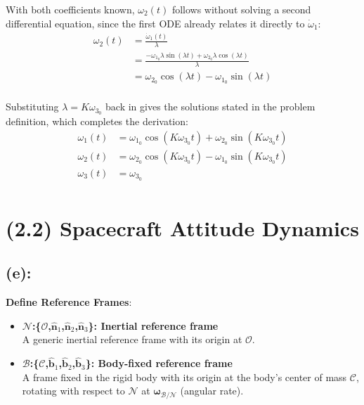 \documentclass[titlepage]{article}
\begin{document}
With both coefficients known, $\omega_2(t)$ follows without solving a second differential equation, since the first ODE already relates it directly to $\dot{\omega}_1$:
\begin{equation}
	\begin{split}
		\omega_2(t)&=\frac{\dot{\omega}_1(t)}{\lambda} \\
		&=\frac{-\omega_{1_0}\lambda\sin\left(\lambda t\right)+\omega_{2_0}\lambda\cos\left(\lambda t\right)}{\lambda} \\
		&=\omega_{2_0}\cos\left(\lambda t\right)-\omega_{1_0}\sin\left(\lambda t\right) \\
	\end{split}
\end{equation}

\begin{mdframed}[linewidth=1pt, innertopmargin=10pt, innerbottommargin=10pt]
	Substituting $\lambda=K\omega_{3_0}$ back in gives the solutions stated in the problem definition, which completes the derivation:
	\begin{equation}
		\begin{split}
			\omega_1(t)&=\omega_{1_0}\cos(K\omega_{3_0}t)+\omega_{2_0}\sin(K\omega_{3_0}t) \\
			\omega_2(t)&=\omega_{2_0}\cos(K\omega_{3_0}t)-\omega_{1_0}\sin(K\omega_{3_0}t) \\
			\omega_3(t)&=\omega_{3_0} \\
		\end{split}
	\end{equation}
\end{mdframed}

\newpage

\section*{(2.2) Spacecraft Attitude Dynamics}

\subsection*{(e):}
\textbf{Define Reference Frames}:
\begin{itemize}
	\item \textbf{$\mathcal{N}$:\{$\mathcal{O}$,$\hat{\boldsymbol{n}}_1$,$\hat{\boldsymbol{n}}_2$,$\hat{\boldsymbol{n}}_3$\}: Inertial reference frame\\}A generic inertial reference frame with its origin at $\mathcal{O}$.
	\item \textbf{$\mathcal{B}$:\{$\mathcal{C}$,$\hat{\boldsymbol{b}}_1$,$\hat{\boldsymbol{b}}_2$,$\hat{\boldsymbol{b}}_3$\}: Body-fixed reference frame\\}A frame fixed in the rigid body with its origin at the body's center of mass $\mathcal{C}$, rotating with respect to $\mathcal{N}$ at $\boldsymbol{\omega}_{\mathcal{B}/\mathcal{N}}$ (angular rate).
\end{itemize}
\end{document}
